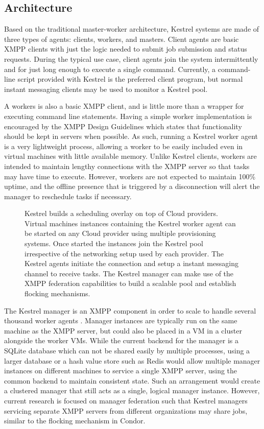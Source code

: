 \subsection{Architecture}

\label{sec:Kestrel:Architecture} Based on the traditional master-worker
architecture, Kestrel systems are made of three types of agents: clients,
workers, and masters. Client agents are basic XMPP clients with just
the logic needed to submit job submission and status requests. During
the typical use case, client agents join the system intermittently
and for just long enough to execute a single command. Currently, a
command-line script provided with Kestrel is the preferred client
program, but normal instant messaging clients may be used to monitor
a Kestrel pool.

A workers is also a basic XMPP client, and is little more than a wrapper
for executing command line statements. Having a simple worker implementation
is encouraged by the XMPP Design Guidelines \cite{XEP-0134} which
states that functionality should be kept in servers when possible.
As such, running a Kestrel worker agent is a very lightweight process,
allowing a worker to be easily included even in virtual machines with
little available memory. Unlike Kestrel clients, workers are intended
to maintain lengthy connections with the XMPP server so that tasks
may have time to execute. However, workers are not expected to maintain
100\% uptime, and the offline presence that is triggered by a disconnection
will alert the manager to reschedule tasks if necessary.

%
\begin{figure}
\caption{\label{fig:Kestrel-Arch} Kestrel builds a scheduling overlay on top
of Cloud providers. Virtual machines instances containing the Kestrel
worker agent can be started on any Cloud provider using multiple provisioning
systems. Once started the instances join the Kestrel pool irrespective
of the networking setup used by each provider. The Kestrel agents
initiate the connection and setup a instant messaging channel to receive
tasks. The Kestrel manager can make use of the XMPP federation capabilities
to build a scalable pool and establish flocking mechanisms.}

\end{figure}


The Kestrel manager is an XMPP component in order to scale to handle
several thousand worker agents \cite{Moffitt2008}. Manager instances
are typically run on the same machine as the XMPP server, but could
also be placed in a VM in a cluster alongside the worker VMs. While
the current backend for the manager is a SQLite \cite{sqlite} database
which can not be shared easily by multiple processes, using a larger
database or a hash value store such as Redis \cite{Redis} would allow
multiple manager instances on different machines to service a single
XMPP server, using the common backend to maintain consistent state.
Such an arrangement would create a clustered manager that still acts
as a single, logical manager instance. However, current research is
focused on manager federation such that Kestrel managers servicing
separate XMPP servers from different organizations may share jobs,
similar to the flocking mechanism in Condor.


